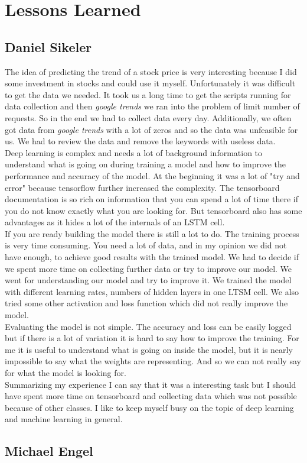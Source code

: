 \section{Lessons Learned}
\label{sec:lessonslearned}

\subsection{Daniel Sikeler}
\label{sec:llDS}
The idea of predicting the trend of a stock price is very interesting because I did some investment in stocks and could use it myself. Unfortunately it was difficult to get the data we needed. It took us a long time to get the scripts running for data collection and then \textit{google trends} we ran into the problem of limit number of requests. So in the end we had to collect data every day. Additionally, we often got data from \textit{google trends} with a lot of zeros and so the data was unfeasible for us. We had to review the data and remove the keywords with useless data.\\
Deep learning is complex and needs a lot of background information to understand what is going on during training a model and how to improve the performance and accuracy of the model. At the beginning it was a lot of "try and error" because tensorflow further increased the complexity. The tensorboard documentation is so rich on information that you can spend a lot of time there if you do not know exactly what you are looking for. But tensorboard also has some advantages as it hides a lot of the internals of an LSTM cell.\\
If you are ready building the model there is still a lot to do. The training process is very time consuming. You need a lot of data, and in my opinion we did not have enough, to achieve good results with the trained model. We had to decide if we spent more time on collecting further data or try to improve our model. We went for understanding our model and try to improve it. We trained the model with different learning rates, numbers of hidden layers in one LTSM cell. We also tried some other activation and loss function which did not really improve the model.\\
Evaluating the model is not simple. The accuracy and loss can be easily logged but if there is a lot of variation it is hard to say how to improve the training. For me it is useful to understand what is going on inside the model, but it is nearly impossible to say what the weights are representing. And so we can not really say for what the model is looking for.\\
Summarizing my experience I can say that it was a interesting task but I should have spent more time on tensorboard and collecting data which was not possible because of other classes. I like to keep myself busy on the topic of deep learning and machine learning in general. 

\subsection{Michael Engel}
\label{sec:llME}